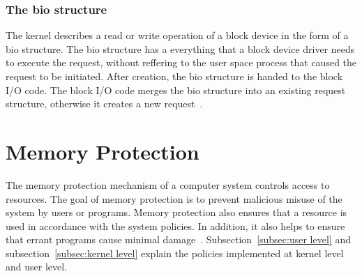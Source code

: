 \subsubsection*{The bio structure}
The kernel describes a read or write operation of a block device in the form of a bio structure. The bio structure has a everything that a block device driver needs to execute the request, without reffering to the user space process that caused the request to be initiated. After creation, the bio structure is handed to the block I/O code. The block I/O code merges the bio structure into an existing request structure, otherwise it creates a new request~\cite{Corbet:2005:LDD:1209083}. 

\section{Memory Protection}
The memory protection mechanism of a computer system controls access to resources. The goal of memory protection is to prevent malicious misuse of the system by users or programs. Memory protection also ensures that a resource is used in accordance with the system policies. In addition, it also helps to ensure that errant programs cause minimal damage~\cite{Galvin, Graham:1971:PPP:1478873.1478928}. Subsection~\ref{subsec:user level} and subsection~\ref{subsec:kernel level} explain the policies implemented at kernel level and user level. 

